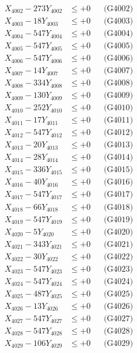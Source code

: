 \documentclass[a4paper,10pt]{article}
\begin{document}
{\begin{align}
X_{4002} - 273Y_{4002} &\leq +0 && \text{(G4002)} \\
X_{4003} - 18Y_{4003} &\leq +0 && \text{(G4003)} \\
X_{4004} - 547Y_{4004} &\leq +0 && \text{(G4004)} \\
X_{4005} - 547Y_{4005} &\leq +0 && \text{(G4005)} \\
X_{4006} - 547Y_{4006} &\leq +0 && \text{(G4006)} \\
X_{4007} - 14Y_{4007} &\leq +0 && \text{(G4007)} \\
X_{4008} - 334Y_{4008} &\leq +0 && \text{(G4008)} \\
X_{4009} - 130Y_{4009} &\leq +0 && \text{(G4009)} \\
X_{4010} - 252Y_{4010} &\leq +0 && \text{(G4010)} \\
\allowbreak
X_{4011} - 17Y_{4011} &\leq +0 && \text{(G4011)} \\
X_{4012} - 547Y_{4012} &\leq +0 && \text{(G4012)} \\
X_{4013} - 20Y_{4013} &\leq +0 && \text{(G4013)} \\
X_{4014} - 28Y_{4014} &\leq +0 && \text{(G4014)} \\
X_{4015} - 336Y_{4015} &\leq +0 && \text{(G4015)} \\
X_{4016} - 40Y_{4016} &\leq +0 && \text{(G4016)} \\
X_{4017} - 547Y_{4017} &\leq +0 && \text{(G4017)} \\
X_{4018} - 66Y_{4018} &\leq +0 && \text{(G4018)} \\
X_{4019} - 547Y_{4019} &\leq +0 && \text{(G4019)} \\
X_{4020} - 5Y_{4020} &\leq +0 && \text{(G4020)} \\
\allowbreak
X_{4021} - 343Y_{4021} &\leq +0 && \text{(G4021)} \\
X_{4022} - 30Y_{4022} &\leq +0 && \text{(G4022)} \\
X_{4023} - 547Y_{4023} &\leq +0 && \text{(G4023)} \\
X_{4024} - 547Y_{4024} &\leq +0 && \text{(G4024)} \\
X_{4025} - 487Y_{4025} &\leq +0 && \text{(G4025)} \\
X_{4026} - 13Y_{4026} &\leq +0 && \text{(G4026)} \\
X_{4027} - 547Y_{4027} &\leq +0 && \text{(G4027)} \\
X_{4028} - 547Y_{4028} &\leq +0 && \text{(G4028)} \\
X_{4029} - 106Y_{4029} &\leq +0 && \text{(G4029)} \\

\end{align}}
\end{document}
